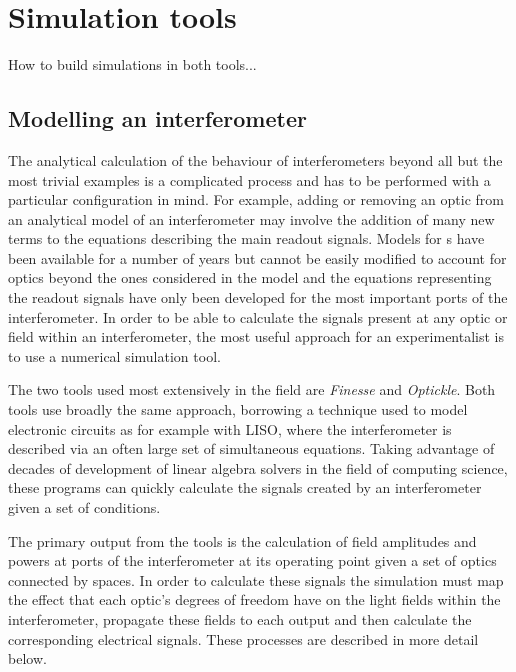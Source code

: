 \chapter{\label{a:simulation-tools}Simulation tools}
How to build simulations in both tools...




\section{Modelling an interferometer}
The analytical calculation of the behaviour of interferometers beyond all but the most trivial examples is a complicated process and has to be performed with a particular configuration in mind. For example, adding or removing an optic from an analytical model of an interferometer may involve the addition of many new terms to the equations describing the main readout signals. Models for \DRFPMI{}s have been available for a number of years  but cannot be easily modified to account for optics beyond the ones considered in the model and the equations representing the readout signals have only been developed for the most important ports of the interferometer. In order to be able to calculate the signals present at any optic or field within an interferometer, the most useful approach for an experimentalist is to use a numerical simulation tool.

The two tools used most extensively in the field are \emph{Finesse} and \emph{Optickle}. Both tools use broadly the same approach, borrowing a technique used to model electronic circuits as for example with \gls{LISO}, where the interferometer is described via an often large set of simultaneous equations. Taking advantage of decades of development of linear algebra solvers in the field of computing science, these programs can quickly calculate the signals created by an interferometer given a set of conditions.

The primary output from the tools is the calculation of field amplitudes and powers at ports of the interferometer at its operating point given a set of optics connected by spaces. In order to calculate these signals the simulation must map the effect that each optic's degrees of freedom have on the light fields within the interferometer, propagate these fields to each output and then calculate the corresponding electrical signals. These processes are described in more detail below. 


